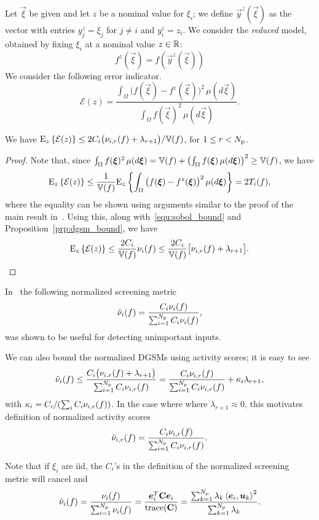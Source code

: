 Let $\vec\xi$ be given and let $z$ be a nominal value for $\xi_i$;  we define 
$\vec{y}^z(\vec\xi)$ as the vector with entries $y^z_j = \xi_j$ for $j \neq i$
and $y^z_i = z_i$.
We consider the \emph{reduced} model, 
obtained by fixing $\xi_i$ at a nominal value $z \in \R$: 
\[
f^{z}(\vec\xi) = f(\vec{y}^z(\vec\xi))
\] 
We consider the following error indicator.
\[
\mathcal{E}(z) =
\frac{ \int_\Omega \big( f(\vec\xi) - f^{z}(\vec\xi)\big)^2 \, \mu(d\vec\xi) }
          {\int_\Omega f(\vec\xi)^2 \, \mu(d\vec\xi)}.
\] 
\begin{theorem}
We have $\Ez{ \mathcal{E}(z)} \leq 2C_i\big(\act{f}{i}{r} + \lambda_{r+1}\big)/{\V(f)}$, 
for $1 \leq r < \Np$.
\end{theorem}
%
\begin{proof} 
Note that, since 
$\int_\Omega f(\vec\xi)^2 \, \mu(d\vec\xi) = \V(f) + 
\left(\int_\Omega f(\vec\xi) \, \mu(d\vec\xi)\right)^2 \geq \V(f)$, we have
\[
\Ez{ \mathcal{E}(z)} \leq \frac{1}{\V(f)} \Ez{ 
\int_\Omega \big( f(\vec\xi) - f^{z}(\vec\xi)\big)^2 \, \mu(d\vec\xi)}
= 2 T_i(f), 
\]
where the equality can be shown using arguments similar to the proof of the main result 
in~\cite{SobolTarantolaGatelliEtAl07}. Using this, along with~\eqref{equ:sobol_bound} and
Proposition~\ref{prp:dgsm_bound}, we have 
\[
\Ez{ \mathcal{E}(z)} \leq 
\frac{2C_i}{\V(f)}\nu_i(f)
\leq 
\frac{2C_i}{\V(f)}\big[\act{f}{i}{r} + \lambda_{r+1}\big]. \qedhere
\]
\end{proof}

In~\cite{Vohra:2018} the following normalized screening metric
\[
   \tilde{\nu}_i(f) = \frac{C_i \nu_i(f)}{\sum_{i=1}^\Np C_i \nu_i(f)},
\]
was shown to be useful for detecting unimportant inputs. 

We can also bound the normalized DGSMs using activity scores; it is easy to see  
\[
\tilde{\nu}_i(f) \leq 
\frac{ C_i \big(\act{f}{i}{r} + \lambda_{r+1}\big)}{\sum_{i=1}^\Np C_i \act{f}{i}{r}}
=\frac{C_i \act{f}{i}{r}}{\sum_{i=1}^\Np C_i \act{f}{i}{r}} + \kappa_i \lambda_{r+1}, 
\]
with $\kappa_i = C_i / (\sum_i C_i \act{f}{i}{r})$. 
In the case where where $\lambda_{r+1} \approx 0$, 
this motivates definition of
normalized activity scores
\[
   \actt{f}{i}{r} =  \frac{C_i \act{f}{i}{r}}{\sum_{i=1}^\Np C_i \act{f}{i}{r}}.
\] 

\begin{remark}
Note that if $\xi_i$ are iid, the $C_i$'s in the definition of the 
normalized screening metric will cancel and 
\[
    \tilde{\nu}_i(f) = \frac{\nu_i(f)}{\sum_{i=1}^\Np \nu_i(f)} 
      = \frac{\vec{e}_i^T \mat{C} \vec{e}_i}{\trace(\mat{C})} 
      = \frac{\sum_{k=1}^\Np \lambda_k \ip{\vec{e}_i}{\vec{u}_k}^2}{\sum_{k = 1}^\Np \lambda_k}.
\]
\end{remark}
